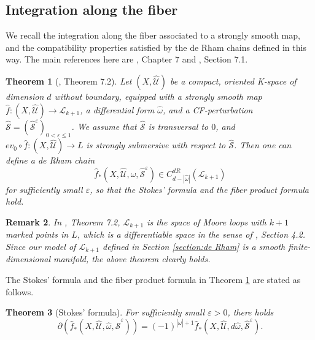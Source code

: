 \documentclass[a4paper]{article}
\newtheorem{theorem}{Theorem}
\newtheorem{remark}[theorem]{Remark}
\numberwithin{equation}{section}
\begin{document}
\subsection{Integration along the fiber}\label{section:pushforward}

We recall the integration along the fiber associated to a strongly smooth map, and the compatibility properties satisfied by the de Rham chains defined in this way. The main references here are \cite{fooo4}, Chapter 7 and \cite{ki2}, Section 7.1.

\begin{theorem}[\cite{ki2}, Theorem 7.2]\label{theorem:pushforward}
Let $(X,\widehat{\mathcal{U}})$ be a compact, oriented K-space of dimension $d$ without boundary, equipped with a strongly smooth map $\hat{f}:(X,\widehat{\mathcal{U}})\rightarrow\mathcal{L}_{k+1}$, a differential form $\hat{\omega}$, and a CF-perturbation $\widehat{\mathcal{S}}=(\widehat{\mathcal{S}}^\varepsilon)_{0<\varepsilon\leq1}$. We assume that $\widehat{\mathcal{S}}$ is transversal to $0$, and $\mathit{ev}_0\circ\hat{f}:(X,\widehat{\mathcal{U}})\rightarrow L$ is strongly submersive with respect to $\widehat{\mathcal{S}}$. Then one can define a de Rham chain
\begin{equation}
\hat{f}_\ast(X,\widehat{\mathcal{U}},\hat{\omega},\widehat{\mathcal{S}}^\varepsilon)\in C_{d-|\hat{\omega}|}^\mathit{dR}(\mathcal{L}_{k+1})
\end{equation}
for sufficiently small $\varepsilon$, so that the Stokes' formula and the fiber product formula hold.
\end{theorem}

\begin{remark}
In \cite{ki2}, Theorem 7.2, $\mathcal{L}_{k+1}$ is the space of Moore loops with $k+1$ marked points in $L$, which is a differentiable space in the sense of \cite{ki1}, Section 4.2. Since our model of $\mathcal{L}_{k+1}$ defined in Section \ref{section:de Rham} is a smooth finite-dimensional manifold, the above theorem clearly holds.
\end{remark}

The Stokes' formula and the fiber product formula in Theorem \ref{theorem:pushforward} are stated as follows.

\begin{theorem}[Stokes' formula]\label{theorem:Stokes}
For sufficiently small $\varepsilon>0$, there holds
\begin{equation}
\partial\left(\hat{f}_\ast(X,\widehat{\mathcal{U}},\hat{\omega},\widehat{\mathcal{S}}^\varepsilon)\right)=(-1)^{|\hat{\omega}|+1}\hat{f}_\ast(X,\widehat{\mathcal{U}},d\hat{\omega},\widehat{\mathcal{S}}^\varepsilon).
\end{equation}
\end{theorem}
\end{document}
